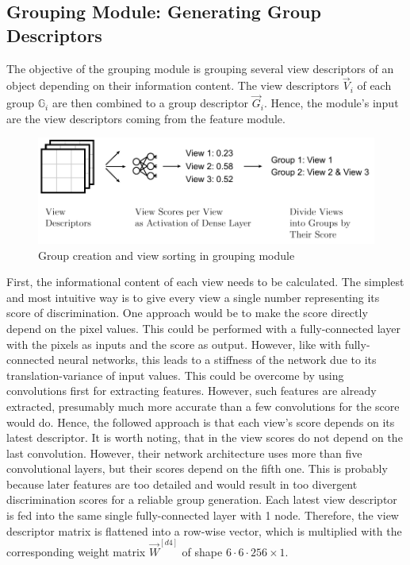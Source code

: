 \subsection{Grouping Module: Generating Group Descriptors}
\label{sec:architecture-grouping-module}
The objective of the grouping module is grouping several view descriptors of an object depending on their information content.
The view descriptors $\vec{V}_i$ of each group $\mathbb{G}_i$ are then combined to a group descriptor $\vec{G}_i$.
Hence, the module's input are the view descriptors coming from the feature module.
\begin{figure}
	\centering
	\includegraphics[]{images/grouping_module_groups.pdf}
	\caption{Group creation and view sorting in grouping module}
	\label{fig:grouping-module-groups}
\end{figure}
First, the informational content of each view needs to be calculated.
The simplest and most intuitive way is to give every view a single number representing its score of discrimination.
One approach would be to make the score directly depend on the pixel values.
This could be performed with a fully-connected layer with the pixels as inputs and the score as output.
However, like with fully-connected neural networks, this leads to a stiffness of the network due to its translation-variance of input values. 
This could be overcome by using convolutions first for extracting features.
However, such features are already extracted, presumably much more accurate than a few convolutions for the score would do. 
Hence, the followed approach is that each view's score depends on its latest descriptor.
It is worth noting, that in \cite{Feng2018} the view scores do not depend on the last convolution.
However, their network architecture uses more than five convolutional layers, but their scores depend on the fifth one.
This is probably because later features are too detailed and would result in too divergent discrimination scores for a reliable group generation.
Each latest view descriptor is fed into the same single fully-connected layer with 1 node.
Therefore, the view descriptor matrix is flattened into a row-wise vector, which is multiplied with the corresponding weight matrix $\vec{W}^{[d4]}$ of shape $6 \cdot 6 \cdot 256 \times 1$.
